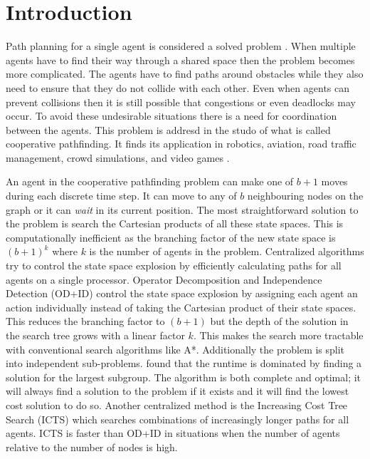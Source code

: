 \section{Introduction}\label{sec:intro}
Path planning for a single agent is considered a solved problem
\citep{sharon2013}. When multiple agents have to find their way through a
shared
space then the problem becomes more complicated. The agents have to find paths
around obstacles while they also need to ensure that they do not collide with
each other. Even when agents can prevent collisions then it is still possible
that congestions or even deadlocks may occur. To avoid these undesirable
situations there is a need for coordination between the agents. This problem is
addresd in the studo of what is called cooperative pathfinding. It finds its
application in robotics, aviation, road traffic management, crowd simulations,
and video games \citep{standley2011}.

An agent in the cooperative pathfinding problem can make one of $b+1$ moves 
during each discrete time step. It can move to any of $b$ neighbouring nodes on 
the graph or it can \emph{wait} in its current position. The most 
straightforward 
solution to the problem is search the Cartesian products of all these state 
spaces. This is computationally inefficient \citep{hopcroft1984,sharon2013} as 
the branching factor of the new state space is $(b+1)^k$ where $k$ is the 
number of agents in the problem. Centralized algorithms try to control the 
state space explosion by efficiently calculating paths for all agents on a 
single processor. Operator Decomposition and Independence Detection (OD+ID) 
\citep{standley2010,standley2011} control the state space explosion by 
assigning each agent an action individually instead of taking the Cartesian 
product of their state spaces. This reduces the branching factor to $(b+1)$ but 
the depth of the solution in the search tree grows with a linear factor $k$. 
This makes the search more tractable with conventional search algorithms like 
A*. Additionally the problem is split into independent sub-problems.
\cite{standley2010} found that the runtime is dominated by finding a solution 
for the largest subgroup. The algorithm is both complete and optimal; it will 
always find a solution to the problem if it exists and it will find the lowest 
cost solution to do so. Another centralized method is the Increasing Cost Tree 
Search (ICTS) \citep{sharon2013} which searches combinations of increasingly 
longer paths for all agents. ICTS is faster than OD+ID in situations when the 
number of agents relative to the number of nodes is high.

